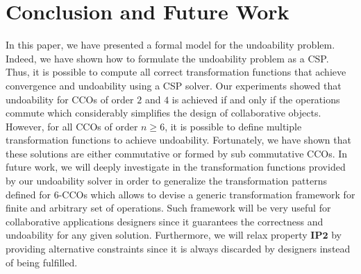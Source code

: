 \documentclass[submission,copyright,creativecommons]{eptcs}
\begin{document}
\section{Conclusion and Future Work}
In this paper, we have presented a formal model for the undoability problem. Indeed, we have shown how to formulate the undoability problem as a CSP. Thus, it is possible to compute all correct transformation functions that achieve convergence and undoability  using a CSP solver. Our experiments showed that  undoability for CCOs of order $2$ and $4$ is  achieved if and only if the operations commute  which considerably simplifies the design of collaborative objects. However, for all CCOs of order $n\geq 6$, it is possible to define multiple transformation functions to achieve undoability. Fortunately, we have shown that these solutions are either commutative or formed by sub commutative CCOs. In future work,  we will deeply investigate in the transformation functions provided by our undoability solver in order to generalize the transformation patterns defined for 6-CCOs which allows to devise a generic transformation framework for finite and arbitrary set of operations. Such framework will be very useful for collaborative applications designers since it guarantees the correctness and undoability for any given solution. Furthermore, we will relax property $\mathbf{IP2}$ by providing alternative constraints since it is   always discarded by designers instead of being fulfilled.



 



\end{document}
